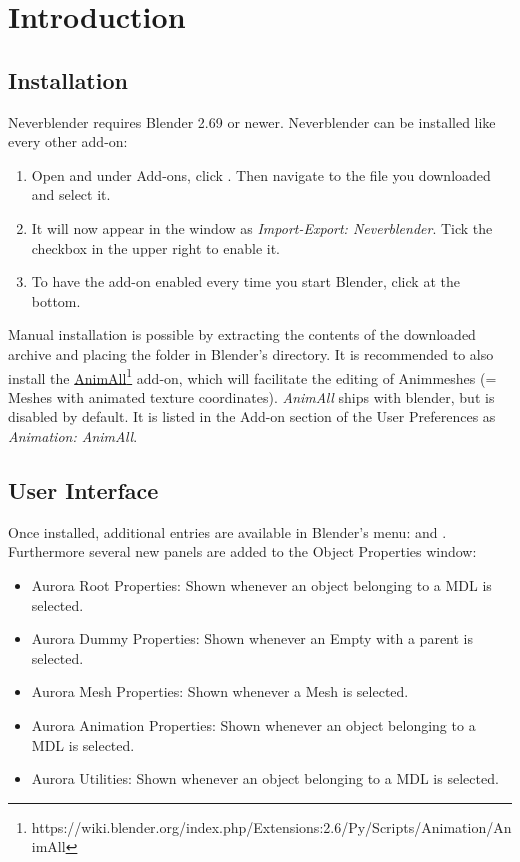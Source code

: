 \chapter{Introduction}

\section{Installation}
Neverblender requires Blender 2.69 or newer. Neverblender can be installed
like every other add-on:
\begin{enumerate}
\item Open  and under Add-ons, 
click . Then navigate to the file you downloaded and select it.
\item It will now appear in the window as \textit{Import-Export: Neverblender}. Tick the checkbox in the upper right to enable it.
\item To have the add-on enabled every time you start Blender, click  at the bottom.
\end{enumerate}
Manual installation is possible by extracting the contents of the downloaded archive and 
placing the  folder in Blender's  directory. 
It is recommended to also install the \href{https://wiki.blender.org/index.php/Extensions:2.6/Py/Scripts/Animation/AnimAll}{AnimAll}\footnote{https://wiki.blender.org/index.php/Extensions:2.6/Py/Scripts/Animation/AnimAll} add-on, which will facilitate the 
editing of Animmeshes (= Meshes with animated texture coordinates). \textit{AnimAll} ships with 
blender, but is disabled by default. It is listed in the Add-on section of the User 
Preferences as \textit{Animation: AnimAll}.

\section{User Interface}
Once installed, additional entries are available in Blender's menu:  and 
. Furthermore several new panels are added to the Object Properties window:
\begin{itemize}
\item Aurora Root Properties: Shown whenever an object belonging to a MDL is selected.
\item Aurora Dummy Properties: Shown whenever an Empty with a parent is selected.
\item Aurora Mesh Properties: Shown whenever a Mesh is selected.
\item Aurora Animation Properties: Shown whenever an object belonging to a MDL is selected.
\item Aurora Utilities: Shown whenever an object belonging to a MDL is selected.
\end{itemize}